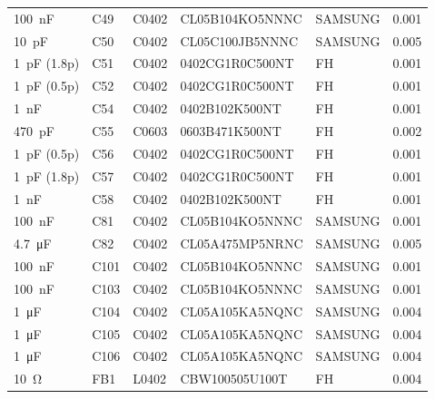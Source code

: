 \begin{appendices}
\begin{footnotesize}
\begin{longtable}{llllll}
    \SI{100}{\nano\farad} & C49 & C0402 & CL05B104KO5NNNC & SAMSUNG & 0.001 \\
    \SI{10}{\pico\farad} & C50 & C0402 & CL05C100JB5NNNC & SAMSUNG & 0.005 \\
    \SI{1}{\pico\farad} (1.8p) & C51 & C0402 & 0402CG1R0C500NT & FH & 0.001 \\
    \SI{1}{\pico\farad} (0.5p) & C52 & C0402 & 0402CG1R0C500NT & FH & 0.001 \\
    \SI{1}{\nano\farad} & C54 & C0402 & 0402B102K500NT & FH & 0.001 \\
    \SI{470}{\pico\farad} & C55 & C0603 & 0603B471K500NT & FH & 0.002 \\
    \SI{1}{\pico\farad} (0.5p) & C56 & C0402 & 0402CG1R0C500NT & FH & 0.001 \\
    \SI{1}{\pico\farad} (1.8p) & C57 & C0402 & 0402CG1R0C500NT & FH & 0.001 \\
    \SI{1}{\nano\farad} & C58 & C0402 & 0402B102K500NT & FH & 0.001 \\
    \SI{100}{\nano\farad} & C81 & C0402 & CL05B104KO5NNNC & SAMSUNG & 0.001 \\
    \SI{4.7}{\micro\farad} & C82 & C0402 & CL05A475MP5NRNC & SAMSUNG & 0.005 \\
    \SI{100}{\nano\farad} & C101 & C0402 & CL05B104KO5NNNC & SAMSUNG & 0.001 \\
    \SI{100}{\nano\farad} & C103 & C0402 & CL05B104KO5NNNC & SAMSUNG & 0.001 \\
    \SI{1}{\micro\farad} & C104 & C0402 & CL05A105KA5NQNC & SAMSUNG & 0.004 \\
    \SI{1}{\micro\farad} & C105 & C0402 & CL05A105KA5NQNC & SAMSUNG & 0.004 \\
    \SI{1}{\micro\farad} & C106 & C0402 & CL05A105KA5NQNC & SAMSUNG & 0.004 \\
    \SI{10}{\ohm} & FB1 & L0402 & CBW100505U100T & FH & 0.004 \\


\end{longtable}
\end{footnotesize}
\end{appendices}

